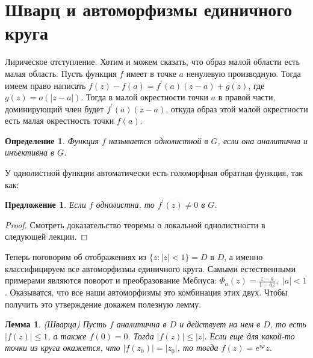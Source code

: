 \documentclass[12pt,a4paper]{article} %
\newtheorem{lemma}{Лемма}
\newtheorem{definition}{Определение}
\newtheorem{proposition}{Предложение}
\begin{document}
	\section{Шварц и автоморфизмы единичного круга}
	Лирическое отступление. Хотим и можем сказать, что образ малой области есть малая область. Пусть функция $f$ имеет в точке $a$ ненулевую производную. Тогда имеем право написать $f(z)-f(a)=f^{'}(a)(z-a)+g(z)$, где $g(z)=o(|z-a|)$. Тогда в малой окрестности точки $a$ в правой части, доминирующий член будет $f^{'}(a)(z-a)$, откуда образ этой малой окрестности есть малая окрестность точки $f(a)$.
	\begin{definition}
		Функция $f$ называется однолистной в $G$, если она аналитична и инъективна в $G$.
	\end{definition}
	У однолистной функции автоматически есть голоморфная обратная функция, так как:
	\begin{proposition}
		Если $f$ однолистна, то $f^{'}(z)\neq 0$ в $G$.
	\end{proposition}
	\begin{proof}
		Смотреть доказательство теоремы о локальной однолистности в следующей лекции.
	\end{proof}
	Теперь поговорим об отображениях из $\{z: |z|<1\}=D$ в $D$, а именно классифицируем все автоморфизмы единичного круга. Самыми естественными примерами являются поворот и преобразование Мебиуса: $\Phi_a(z)=\displaystyle\frac{z-a}{1-\overline{a}z},\,\,|a|<1$. Оказыватся, что все наши автоморфизмы это комбинация этих двух. Чтобы получить это утверждение докажем полезную лемму.
	\begin{lemma}\label{л_Шварца}
		(Шварца) Пусть $f$ аналитична в $D$ и действует на нем в $D$, то есть $|f(z)|\leq 1$, а также $f(0)=0$. Тогда $|f(z)|\leq |z|$. Если еще для какой-то точки из круга окажется, что $|f(z_0)|=|z_0|$, то тогда $f(z)=e^{i\varphi}z$.
	\end{lemma}
\end{document}
